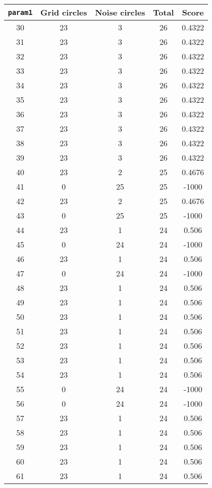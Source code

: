 \documentclass[letterpaper, 12pt]{article}
\begin{document}
\begin{longtable}{|c|c|c|c|c|}
\hline
\textbf{\texttt{param1}} & \textbf{Grid circles} & \textbf{Noise circles} & \textbf{Total} & \textbf{Score} \\
\hline
30 & 23 & 3 & 26 & 0.4322 \\
\hline
31 & 23 & 3 & 26 & 0.4322 \\
\hline
32 & 23 & 3 & 26 & 0.4322 \\
\hline
33 & 23 & 3 & 26 & 0.4322 \\
\hline
34 & 23 & 3 & 26 & 0.4322 \\
\hline
35 & 23 & 3 & 26 & 0.4322 \\
\hline
36 & 23 & 3 & 26 & 0.4322 \\
\hline
37 & 23 & 3 & 26 & 0.4322 \\
\hline
38 & 23 & 3 & 26 & 0.4322 \\
\hline
39 & 23 & 3 & 26 & 0.4322 \\
\hline
40 & 23 & 2 & 25 & 0.4676 \\
\hline
41 & 0 & 25 & 25 & -1000 \\
\hline
42 & 23 & 2 & 25 & 0.4676 \\
\hline
43 & 0 & 25 & 25 & -1000 \\
\hline
44 & 23 & 1 & 24 & 0.506 \\
\hline
45 & 0 & 24 & 24 & -1000 \\
\hline
46 & 23 & 1 & 24 & 0.506 \\
\hline
47 & 0 & 24 & 24 & -1000 \\
\hline
48 & 23 & 1 & 24 & 0.506 \\
\hline
49 & 23 & 1 & 24 & 0.506 \\
\hline
50 & 23 & 1 & 24 & 0.506 \\
\hline
51 & 23 & 1 & 24 & 0.506 \\
\hline
52 & 23 & 1 & 24 & 0.506 \\
\hline
53 & 23 & 1 & 24 & 0.506 \\
\hline
54 & 23 & 1 & 24 & 0.506 \\
\hline
55 & 0 & 24 & 24 & -1000 \\
\hline
56 & 0 & 24 & 24 & -1000 \\
\hline
57 & 23 & 1 & 24 & 0.506 \\
\hline
58 & 23 & 1 & 24 & 0.506 \\
\hline
59 & 23 & 1 & 24 & 0.506 \\
\hline
60 & 23 & 1 & 24 & 0.506 \\
\hline
61 & 23 & 1 & 24 & 0.506 \\

\end{longtable}
\end{document}
